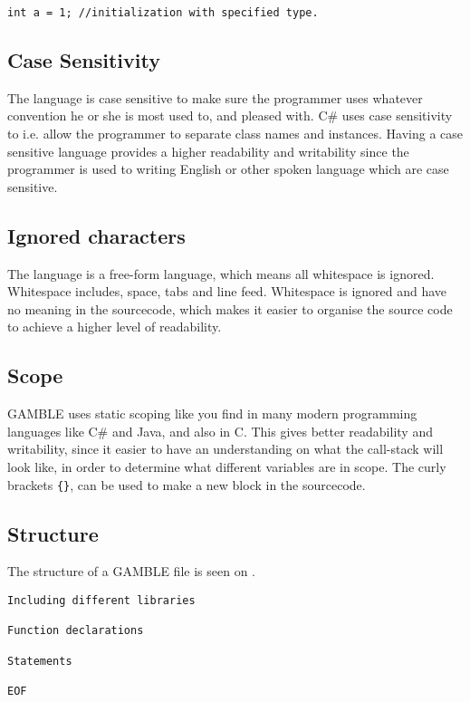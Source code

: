 \begin{lstlisting}[caption={Comment and Semicolon},label={lst:CommSemi}]
int a = 1; //initialization with specified type.
\end{lstlisting}

\subsection*{Case Sensitivity}
The language is case sensitive to make sure the programmer uses whatever convention he or she is most used to, and pleased with.
C\# uses case sensitivity to i.e. allow the programmer to separate class names and instances.
Having a case sensitive language provides a higher readability and writability since the programmer is used to writing English or other spoken language which are case sensitive.

\subsection*{Ignored characters}
The language is a free-form language, which means all whitespace is ignored.
Whitespace includes, space, tabs and line feed.
Whitespace is ignored and have no meaning in the sourcecode, which makes it easier to organise the source code to achieve a higher level of readability.

\subsection*{Scope}
GAMBLE uses static scoping like you find in many modern programming languages like C\# and Java, and also in C.
This gives better readability and writability, since it easier to have an understanding on what the call-stack will look like, in order to determine what different variables are in scope.
The curly brackets \texttt{\{\}}, can be used to make a new block in the sourcecode.

\subsection*{Structure} 
The structure of a GAMBLE file is seen on .

\begin{lstlisting}[caption={The structure of GABMLE files},label={lst:Structure}]
Including different libraries

Function declarations

Statements

EOF
\end{lstlisting}


